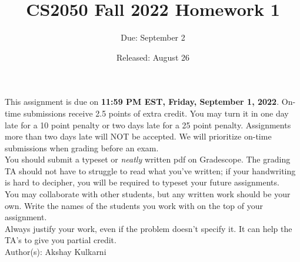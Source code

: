 \documentclass{article}
\title{CS2050 Fall 2022 Homework 1}
\author{Due: September 2}
\date{Released: August 26}
\begin{document}
\maketitle

This assignment is due on \textbf{11:59 PM EST, Friday, September 1, 2022}.  On-time submissions receive 2.5 points of extra credit. You may turn it in one day late for a 10 point penalty or two days late for a 25 point penalty. Assignments more than two days late will NOT be accepted.  We will prioritize on-time submissions when grading before an exam. \\ 

You should submit a typeset or \emph{neatly} written pdf on Gradescope.  The grading TA should not have to struggle to read what you've written; if your handwriting is hard to decipher, you will be required to typeset your future assignments.\\ 

You may collaborate with other students, but any written work should be your own. Write the names of the students you work with on the top of your assignment.\\

Always justify your work, even if the problem doesn't specify it. It can help the TA's to give you partial credit.
\\

Author(s): Akshay Kulkarni

\clearpage
\end{document}
